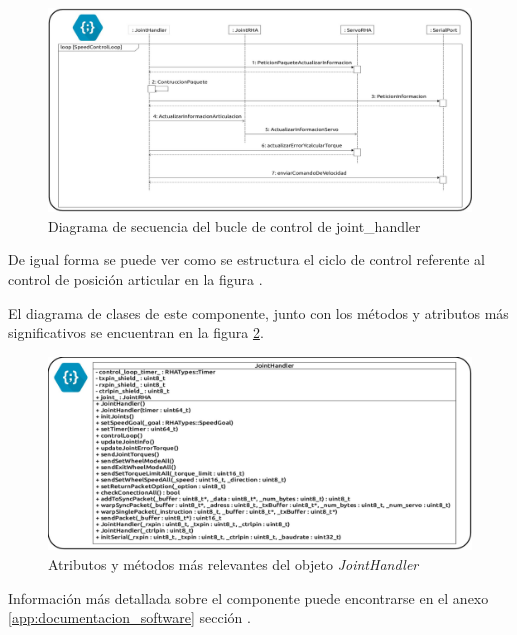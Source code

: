         \begin{figure}[H]
            \centering
            \includegraphics[width=1\textwidth]{figuras/Imagenes_SW/diagrama_secuencia_speed_control.jpg}
            \caption{Diagrama de secuencia del bucle de control de joint\_handler  }
            \label{fig:SW:joint_handler_loop}
        \end{figure}

        De igual forma se puede ver como se estructura el ciclo de control referente al control de posición articular en la figura \completar.

        El diagrama de clases de este componente, junto con los métodos y atributos más significativos se encuentran en la figura \ref{fig:SW:class_diagram_JH}.

        \begin{figure}[H]
            \centering
            \includegraphics[width=1\textwidth]{figuras/Imagenes_SW/class_diagram_JH.jpg}
            \caption{Atributos y métodos más relevantes del objeto \textit{JointHandler} }
            \label{fig:SW:class_diagram_JH}
        \end{figure}

        Información más detallada sobre el componente puede encontrarse en el anexo \ref{app:documentacion_software} sección \completar.
